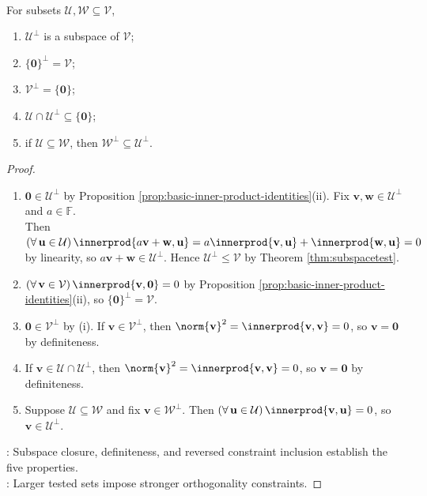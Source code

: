 \begin{proposition} \label{prop:basic-properties-orthogonal-complement} \\
For subsets $\mathcal{U},\mathcal{W}\subseteq\mathcal{V}$,
\begin{enumerate}[label=(\roman*)]
\setlength{\itemsep}{0pt}
\item $\mathcal{U}^{\perp}$ is a subspace of $\mathcal{V}$;
\item $\{\mathbf{0}\}^{\perp}=\mathcal{V}$;
\item $\mathcal{V}^{\perp}=\{\mathbf{0}\}$;
\item $\mathcal{U}\cap\mathcal{U}^{\perp}\subseteq\{\mathbf{0}\}$;
\item if $\mathcal{U}\subseteq\mathcal{W}$, then $\mathcal{W}^{\perp}\subseteq\mathcal{U}^{\perp}$.
\end{enumerate}
\begin{proof}
\begin{enumerate}[label=(\roman*)]
\setlength{\itemsep}{0pt}
\item $\mathbf{0}\in\mathcal{U}^{\perp}$ by Proposition \ref{prop:basic-inner-product-identities}(ii). Fix $\mathbf{v},\mathbf{w}\in\mathcal{U}^{\perp}$ and $a\in\mathbb{F}$.\\
Then $(\forall\,\mathbf{u}\in\mathcal{U})\,\innerprod{a\mathbf{v}+\mathbf{w},\mathbf{u}}=a\innerprod{\mathbf{v},\mathbf{u}}+\innerprod{\mathbf{w},\mathbf{u}}=0$ by linearity, so $a\mathbf{v}+\mathbf{w}\in\mathcal{U}^{\perp}$. Hence $\mathcal{U}^{\perp}\leq\mathcal{V}$ by Theorem \ref{thm:subspacetest}.
\item $(\forall\,\mathbf{v}\in\mathcal{V})\,\innerprod{\mathbf{v},\mathbf{0}}=0$ by Proposition \ref{prop:basic-inner-product-identities}(ii), so $\{\mathbf{0}\}^{\perp}=\mathcal{V}$.
\item $\mathbf{0}\in\mathcal{V}^{\perp}$ by (i). If $\mathbf{v}\in\mathcal{V}^{\perp}$, then $\norm{\mathbf{v}}^2=\innerprod{\mathbf{v},\mathbf{v}}=0$, so $\mathbf{v}=\mathbf{0}$ by definiteness.
\item If $\mathbf{v}\in\mathcal{U}\cap\mathcal{U}^{\perp}$, then $\norm{\mathbf{v}}^2=\innerprod{\mathbf{v},\mathbf{v}}=0$, so $\mathbf{v}=\mathbf{0}$ by definiteness.
\item Suppose $\mathcal{U}\subseteq\mathcal{W}$ and fix $\mathbf{v}\in\mathcal{W}^{\perp}$. Then $(\forall\,\mathbf{u}\in\mathcal{U})\,\innerprod{\mathbf{v},\mathbf{u}}=0$, so $\mathbf{v}\in\mathcal{U}^{\perp}$.
\end{enumerate}
: Subspace closure, definiteness, and reversed constraint inclusion establish the five properties.\\
: Larger tested sets impose stronger orthogonality constraints.
\end{proof}
\end{proposition}

